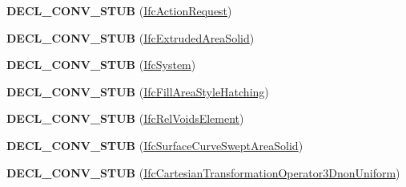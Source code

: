 \begin{DoxyCompactItemize}
\item 
\hypertarget{namespace_assimp_1_1_s_t_e_p_aca766ca67fb58088c7429520061a1b1e}{{\bfseries D\+E\+C\+L\+\_\+\+C\+O\+N\+V\+\_\+\+S\+T\+U\+B} (\hyperlink{struct_assimp_1_1_i_f_c_1_1_ifc_action_request}{Ifc\+Action\+Request})}\label{namespace_assimp_1_1_s_t_e_p_aca766ca67fb58088c7429520061a1b1e}

\item 
\hypertarget{namespace_assimp_1_1_s_t_e_p_addb5967128385db46e47d5e7bcb2329f}{{\bfseries D\+E\+C\+L\+\_\+\+C\+O\+N\+V\+\_\+\+S\+T\+U\+B} (\hyperlink{struct_assimp_1_1_i_f_c_1_1_ifc_extruded_area_solid}{Ifc\+Extruded\+Area\+Solid})}\label{namespace_assimp_1_1_s_t_e_p_addb5967128385db46e47d5e7bcb2329f}

\item 
\hypertarget{namespace_assimp_1_1_s_t_e_p_a686579e9f16b6b91176263f1f48c698f}{{\bfseries D\+E\+C\+L\+\_\+\+C\+O\+N\+V\+\_\+\+S\+T\+U\+B} (\hyperlink{struct_assimp_1_1_i_f_c_1_1_ifc_system}{Ifc\+System})}\label{namespace_assimp_1_1_s_t_e_p_a686579e9f16b6b91176263f1f48c698f}

\item 
\hypertarget{namespace_assimp_1_1_s_t_e_p_a5c8a1ddff13a20dde62f045148a189a5}{{\bfseries D\+E\+C\+L\+\_\+\+C\+O\+N\+V\+\_\+\+S\+T\+U\+B} (\hyperlink{struct_assimp_1_1_i_f_c_1_1_ifc_fill_area_style_hatching}{Ifc\+Fill\+Area\+Style\+Hatching})}\label{namespace_assimp_1_1_s_t_e_p_a5c8a1ddff13a20dde62f045148a189a5}

\item 
\hypertarget{namespace_assimp_1_1_s_t_e_p_aa0f530203f2f0e93b6b8029ba9e5bf5f}{{\bfseries D\+E\+C\+L\+\_\+\+C\+O\+N\+V\+\_\+\+S\+T\+U\+B} (\hyperlink{struct_assimp_1_1_i_f_c_1_1_ifc_rel_voids_element}{Ifc\+Rel\+Voids\+Element})}\label{namespace_assimp_1_1_s_t_e_p_aa0f530203f2f0e93b6b8029ba9e5bf5f}

\item 
\hypertarget{namespace_assimp_1_1_s_t_e_p_a9ca1645706890d934bb06762e039ea1a}{{\bfseries D\+E\+C\+L\+\_\+\+C\+O\+N\+V\+\_\+\+S\+T\+U\+B} (\hyperlink{struct_assimp_1_1_i_f_c_1_1_ifc_surface_curve_swept_area_solid}{Ifc\+Surface\+Curve\+Swept\+Area\+Solid})}\label{namespace_assimp_1_1_s_t_e_p_a9ca1645706890d934bb06762e039ea1a}

\item 
\hypertarget{namespace_assimp_1_1_s_t_e_p_aa0617b0543ca473572a1cefc5148de9f}{{\bfseries D\+E\+C\+L\+\_\+\+C\+O\+N\+V\+\_\+\+S\+T\+U\+B} (\hyperlink{struct_assimp_1_1_i_f_c_1_1_ifc_cartesian_transformation_operator3_dnon_uniform}{Ifc\+Cartesian\+Transformation\+Operator3\+Dnon\+Uniform})}\label{namespace_assimp_1_1_s_t_e_p_aa0617b0543ca473572a1cefc5148de9f}


\end{DoxyCompactItemize}
